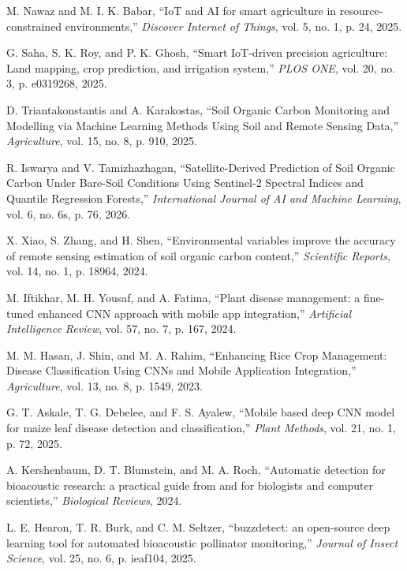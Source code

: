 \documentclass[11pt,a4paper]{article}
\begin{document}
\noindent [8] M. Nawaz and M. I. K. Babar, ``IoT and AI for smart agriculture in resource-constrained environments,'' \textit{Discover Internet of Things}, vol. 5, no. 1, p. 24, 2025.

\noindent [9] G. Saha, S. K. Roy, and P. K. Ghosh, ``Smart IoT-driven precision agriculture: Land mapping, crop prediction, and irrigation system,'' \textit{PLOS ONE}, vol. 20, no. 3, p. e0319268, 2025.

\noindent [10] D. Triantakonstantis and A. Karakostas, ``Soil Organic Carbon Monitoring and Modelling via Machine Learning Methods Using Soil and Remote Sensing Data,'' \textit{Agriculture}, vol. 15, no. 8, p. 910, 2025.

\noindent [11] R. Iswarya and V. Tamizhazhagan, ``Satellite-Derived Prediction of Soil Organic Carbon Under Bare-Soil Conditions Using Sentinel-2 Spectral Indices and Quantile Regression Forests,'' \textit{International Journal of AI and Machine Learning}, vol. 6, no. 6s, p. 76, 2026.

\noindent [12] X. Xiao, S. Zhang, and H. Shen, ``Environmental variables improve the accuracy of remote sensing estimation of soil organic carbon content,'' \textit{Scientific Reports}, vol. 14, no. 1, p. 18964, 2024.

\noindent [13] M. Iftikhar, M. H. Yousaf, and A. Fatima, ``Plant disease management: a fine-tuned enhanced CNN approach with mobile app integration,'' \textit{Artificial Intelligence Review}, vol. 57, no. 7, p. 167, 2024.

\noindent [14] M. M. Hasan, J. Shin, and M. A. Rahim, ``Enhancing Rice Crop Management: Disease Classification Using CNNs and Mobile Application Integration,'' \textit{Agriculture}, vol. 13, no. 8, p. 1549, 2023.

\noindent [15] G. T. Askale, T. G. Debelee, and F. S. Ayalew, ``Mobile based deep CNN model for maize leaf disease detection and classification,'' \textit{Plant Methods}, vol. 21, no. 1, p. 72, 2025.

\noindent [16] A. Kershenbaum, D. T. Blumstein, and M. A. Roch, ``Automatic detection for bioacoustic research: a practical guide from and for biologists and computer scientists,'' \textit{Biological Reviews}, 2024.

\noindent [17] L. E. Hearon, T. R. Burk, and C. M. Seltzer, ``buzzdetect: an open-source deep learning tool for automated bioacoustic pollinator monitoring,'' \textit{Journal of Insect Science}, vol. 25, no. 6, p. ieaf104, 2025.
\end{document}

